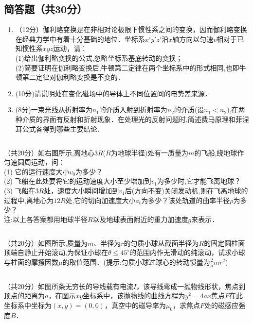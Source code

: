 \subsection{简答题（共30分）}
\begin{enumerate}
\item （12分）伽利略变换是在非相对论极限下惯性系之间的变换，因而伽利略变换在经典力学中有着十分基础的地位．坐标系$x'y'z'$沿$x$轴方向以匀速$v$相对于已知惯性系$xyz$运动，请：\\
(1)给出伽利略变换的公式,忽略坐标系基底转动的变换；\\
(2)简要证明在伽利略变换后,牛顿第二定律在两个坐标系中的形式相同,也即牛顿第二定律对伽利略变换是不变的．\\

\item (10分)请说明处在变化磁场中的导体上不同位置间的电势差来源．

\item (8分)一束光线从折射率为$n_{1}$的介质入射到折射率为$n_{2}$的介质(设$n_{1}<n_{2}$),在两种介质的界面有反射和折射现象．在处理光的反射问题时,简述费马原理和菲涅耳公式各得到哪些主要结论．
\end{enumerate}
\subsection{ }
（共20分）如右图所示,离地心$3R$($R$为地球半径)处有一质量为$m$的飞船,绕地球作匀速圆周运动，问：\\
(1) 它的运行速度大小$v_{0}$为多少？\\
(2) 飞船在此处要将它的运动速度大小至少增加到$v_{1}$为多少时,它才能飞离地球？\\
(3) 飞船在$3R$处，速度大小瞬间增加到$v_{1}$后(方向不变)关闭发动机,则在飞离地球的过程中,离地心为$12R$处,它的切向加速度大小$a_{t}$为多少？该处轨道的曲率半径$\rho$为多少？\\
注:以上各答案都用地球半径$R$以及地球表面附近的重力加速度$g$来表示．

\subsection{ }
（共20分）如图所示,质量为$m$、半径为$r$的匀质小球从截面半径为$R$的固定圆柱面顶端自静止开始滚动,为保证小球在$\theta \le 45^{\circ}$的范围内作无滑动的纯滚动，试求小球与柱面的摩擦因数$\mu$的取值范围．(提示:匀质小球过球心的转动惯量为$\frac{2}{5} mr^{2}$)

\subsection{ }
（共20分）如图所条无穷长的导线载有电流$I$，该导线弯成一抛物线形状，焦点到顶点的距离为$a$，在图示$xy$坐标系中，该抛物线的曲线方程为$y^{2}=4ax$焦点$F$在此坐标系中坐标为$(x,y)=(0,0)$，真空中的磁导率为$\mu_{0}$，求焦点$F$处的磁感应强度$B$．

